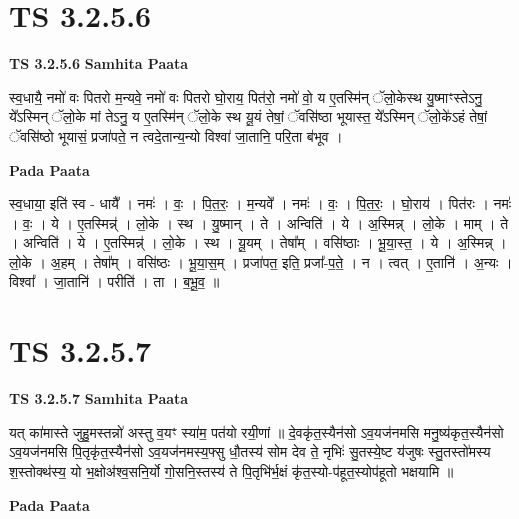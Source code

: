 \documentclass[17pt]{extarticle}
\begin{document}
\section*{ TS 3.2.5.6 }

\textbf{TS 3.2.5.6 } \newline
\textbf{Samhita Paata} \newline

स्व॒धायै॒ नमो॑ वः पितरो म॒न्यवे॒ नमो॑ वः पितरो घो॒राय॒ पित॑रो॒ नमो॑ वो॒ य ए॒तस्मि॑न् ॅलो॒केस्थ यु॒ष्माꣳस्तेऽनु॒ ये᳚ऽस्मिन् ॅलो॒के मां तेऽनु॒ य ए॒तस्मि॑न् ॅलो॒के स्थ यू॒यं तेषां॒ ॅवसि॑ष्ठा भूयास्त॒ ये᳚ऽस्मिन् ॅलो॒के॑ऽहं तेषां॒ ॅवसि॑ष्ठो भूयासं॒ प्रजा॑पते॒ न त्वदे॒तान्य॒न्यो विश्वा॑ जा॒तानि॒ परि॒ता ब॑भूव । \newline

\textbf{Pada Paata} \newline

स्व॒धाया॒ इति॑ स्व - धायै᳚ । नमः॑ । वः॒ । पि॒त॒रः॒ । म॒न्यवे᳚ । नमः॑ । वः॒ । पि॒त॒रः॒ । घो॒राय॑ । पित॑रः । नमः॑ । वः॒ । ये । ए॒तस्मिन्न्॑ । लो॒के । स्थ । यु॒ष्मान् । ते । अन्विति॑ । ये । अ॒स्मिन्न् । लो॒के । माम् । ते । अन्विति॑ । ये । ए॒तस्मिन्न्॑ । लो॒के । स्थ । यू॒यम् । तेषा᳚म् । वसि॑ष्ठाः । भू॒या॒स्त॒ । ये । अ॒स्मिन्न् । लो॒के । अ॒हम् । तेषा᳚म् । वसि॑ष्ठः । भू॒या॒स॒म् । प्रजा॑पत॒ इति॒ प्रजा᳚-प॒ते॒ । न । त्वत् । ए॒तानि॑ । अ॒न्यः । विश्वा᳚ । जा॒तानि॑ । परीति॑ । ता । ब॒भू॒व॒ ॥  \newline




\section*{ TS 3.2.5.7 }

\textbf{TS 3.2.5.7 } \newline
\textbf{Samhita Paata} \newline

यत् का॑मास्ते जुहु॒मस्तन्नो॑ अस्तु व॒यꣳ स्या॑म॒ पत॑यो रयी॒णां ॥ दे॒वकृ॑त॒स्यैन॑सो ऽव॒यज॑नमसि मनु॒ष्य॑कृत॒स्यैन॑सो ऽव॒यज॑नमसि पि॒तृकृ॑त॒स्यैन॑सो ऽव॒यज॑नमस्य॒फ्सु धौ॒तस्य॑ सोम देव ते॒ नृभिः॑ सु॒तस्ये॒ष्ट य॑जुषः स्तु॒तस्तो॑मस्य श॒स्तोक्थ॑स्य॒ यो भ॒क्षोअ॑श्व॒सनि॒र्यो गो॒सनि॒स्तस्य॑ ते पि॒तृभि॑र्भ॒क्षं कृ॑त॒स्यो-प॑हूत॒स्योप॑हूतो भक्षयामि ॥ \newline

\textbf{Pada Paata} \newline
\end{document}
